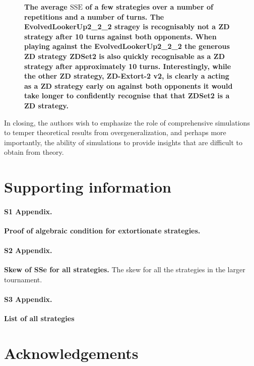 \documentclass[10pt,letterpaper]{article}
\newcommand{\SSe}{\text{SSE}}
\begin{document}
\begin{figure}[!htbp]
    \centering
    \caption{{\bf The average \(\SSe\) of a few strategies over a number of
    repetitions and a number of turns. The EvolvedLookerUp2\_2\_2 stragey is
    recognisably not a ZD strategy after 10 turns against both opponents.  When
    playing against the EvolvedLookerUp2\_2\_2 the generous ZD strategy ZDSet2
    is also quickly recognisable as a ZD strategy after approximately 10 turns.
    Interestingly, while the other ZD strategy, ZD-Extort-2 v2, is clearly a
    acting as a ZD strategy early on against both opponents it would take longer
    to confidently recognise that that ZDSet2 is a ZD strategy.
        }}
    \label{fig:learning_sse}
\end{figure}

In closing, the authors wish to emphasize the role of comprehensive simulations to temper
theoretical results from overgeneralization, and perhaps more importantly, the
ability of simulations to provide insights that are difficult to obtain from theory.


\section*{Supporting information}

\paragraph*{S1 Appendix.}
\label{proof_of_algebraic_condition_for_extortionate_strategies}
{\bf Proof of algebraic condition for extortionate strategies.} 

\paragraph*{S2 Appendix.}
\label{sse_error_in_std_for_auxiliary}
{\bf Skew of SSe for all strategies.} The skew for all the strategies in the larger tournament.

\paragraph*{S3 Appendix.}
\label{list_of_strategies}
{\bf List of all strategies}

\section*{Acknowledgements}
\end{document}
